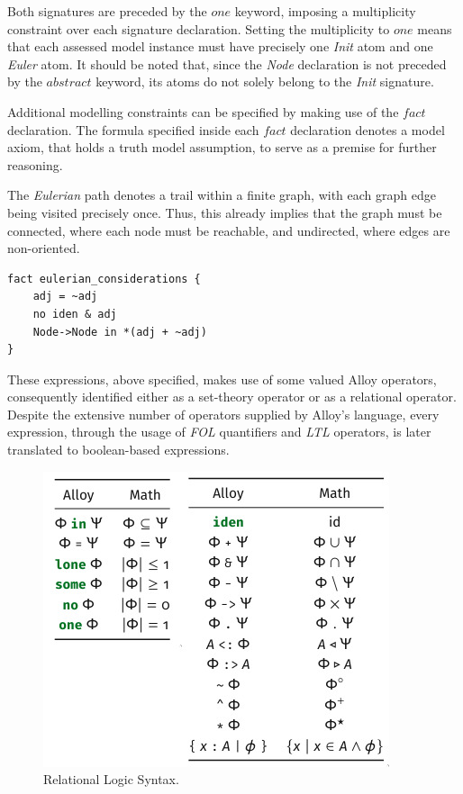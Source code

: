 Both signatures are preceded by the $one$ keyword, imposing a multiplicity constraint over each signature declaration. Setting the multiplicity to $one$ means that each assessed model instance must have precisely one \textit{Init} atom and one \textit{Euler} atom. It should be noted that, since the \textit{Node} declaration is not preceded by the $abstract$ keyword, its atoms do not solely belong to the \textit{Init} signature. 

Additional modelling constraints can be specified by making use of the $fact$ declaration. The formula specified inside each $fact$ declaration denotes a model axiom, that holds a truth model assumption, to serve as a premise for further reasoning. 

The \textit{Eulerian} path denotes a trail within a finite graph, with each graph edge being visited precisely once. Thus, this already implies that the graph must be connected, where each node must be reachable, and undirected, where edges are non-oriented.

\begin{lstlisting}[title={Graph restrictions through $fact$ declaration.}, otherkeywords = {abstract, sig, module, set, fact, iden, no, in, \=, \*, \+, \~, \-\>, \&}, floatplacement=H]
fact eulerian_considerations {
    adj = ~adj
    no iden & adj
    Node->Node in *(adj + ~adj)
}
\end{lstlisting}

These expressions, above specified, makes use of some valued Alloy operators, consequently identified either as a set-theory operator or as a relational operator. Despite the extensive number of operators supplied by Alloy's language, every expression, through the usage of \textit{FOL} quantifiers and \textit{LTL} operators, is later translated to boolean-based expressions. 

\begin{figure}[H]
    \centering
    \includegraphics[width=0.5\linewidth]{images/alloy_relational_logic.jpg}
    \caption{Relational Logic Syntax.}
    \label{fig:alloy-rel}
\end{figure}

